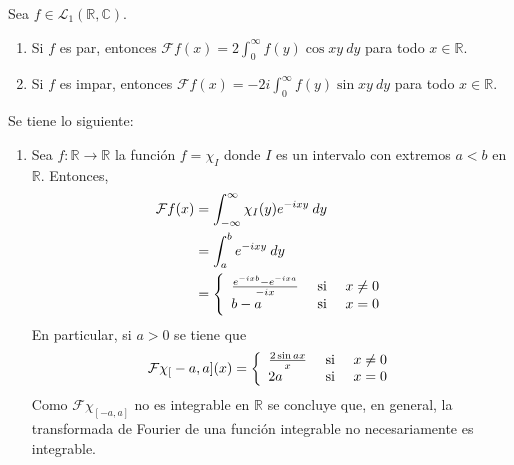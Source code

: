 \documentclass[12pt]{report}
\theoremstyle{largebreak}
\newcommand\cf[3]{\ensuremath{#1:#2\rightarrow#3}}
\newcommand{\fou}[1]{\ensuremath{\mathcal{F}#1}}
\begin{document}
    \begin{cor}
        Sea $f\in\mathcal{L}_1(\mathbb{R},\mathbb{C})$.
        \begin{enumerate}
            \item Si $f$ es par, entonces $\fou{f}(x)=2\int_0^{\infty}f(y)\cos xy\:dy$ para todo $x\in\mathbb{R}$.
            \item Si $f$ es impar, entonces $\fou{f}(x)=-2i\int_0^{\infty}f(y)\sin xy\:dy$ para todo $x\in\mathbb{R}$.
        \end{enumerate}
    \end{cor}

    \begin{exa}
        Se tiene lo siguiente:
        \begin{enumerate}
            \item Sea $\cf{f}{\mathbb{R}}{\mathbb{R}}$ la función $f=\chi_I$ donde $I$ es un intervalo con extremos $a<b$ en $\mathbb{R}$. Entonces,
            \begin{equation*}
                \begin{split}
                    \fou{f}(x)&=\int_{-\infty}^\infty \chi_I(y)e^{ -ixy}\:dy\\
                    &=\int_{a}^b e^{ -ixy}\:dy\\
                    &=\left\{ 
                        \begin{array}{lcr}
                            \frac{e^{ -ixb}-e^{ -ixa}}{-ix} & \textup{ si } & x\neq0\\
                            b-a & \textup{si} & x=0\\
                        \end{array}
                    \right.\\
                \end{split}
            \end{equation*}
            En particular, si $a>0$ se tiene que
            \begin{equation*}
                \fou{\chi_[-a,a]}(x)=\left\{ 
                    \begin{array}{lcr}
                        \frac{2\sin ax}{x} & \textup{ si } & x\neq0\\
                        2a & \textup{si} & x=0\\
                    \end{array}
                \right.
            \end{equation*}
            Como $\fou{\chi_[-a,a]}$ no es integrable en $\mathbb{R}$ se concluye que, en general, la transformada de Fourier de una función integrable no necesariamente es integrable.

\end{enumerate}
\end{exa}
\end{document}
